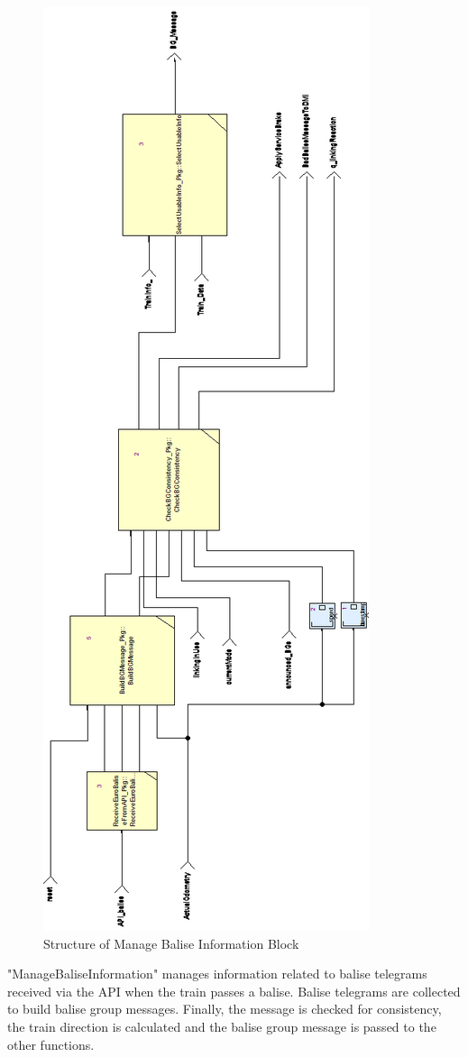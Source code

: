 \documentclass{template/openetcs_report}
\begin{document}
\begin{figure}[hbtp]
\centering
\includegraphics[width=.6\textwidth]{../images/ManageBaliseInformation.png}
\caption{Structure of Manage Balise Information Block}
\end{figure}

"ManageBaliseInformation" manages information related to balise telegrams received via the API when the train passes a balise. Balise telegrams are collected to build balise group messages. Finally, the message is checked for consistency, the train direction is calculated and the balise group message  is passed to the other functions.
\end{document}
